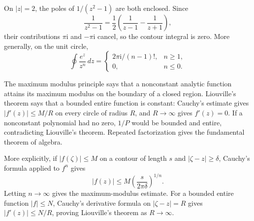 \begin{example}
On $|z|=2$, the poles of $1/(z^2-1)$ are both enclosed. Since
\begin{equation}
\frac{1}{z^2-1}=\frac12\left(\frac{1}{z-1}-\frac{1}{z+1}\right),
\end{equation}
their contributions $\pi\mathrm{i}$ and $-\pi\mathrm{i}$ cancel, so the contour integral is zero. More generally, on the unit circle,
\begin{equation}
\oint\frac{e^z}{z^n}\,dz=\begin{cases}
2\pi\mathrm{i}/(n-1)!,&n\geq1,\\0,&n\leq0.
\end{cases}
\end{equation}
\end{example}

The maximum modulus principle says that a nonconstant analytic function attains its maximum modulus on the boundary of a closed region. Liouville's theorem says that a bounded entire function is constant: Cauchy's estimate gives $|f'(z)|\leq M/R$ on every circle of radius $R$, and $R\to\infty$ gives $f'(z)=0$. If a nonconstant polynomial had no zero, $1/P$ would be bounded and entire, contradicting Liouville's theorem. Repeated factorization gives the fundamental theorem of algebra.

More explicitly, if $|f(\zeta)|\leq M$ on a contour of length $s$ and $|\zeta-z|\geq\delta$, Cauchy's formula applied to $f^n$ gives
\begin{equation}
|f(z)|\leq M\left(\frac{s}{2\pi\delta}\right)^{1/n}.
\end{equation}
Letting $n\to\infty$ gives the maximum-modulus estimate. For a bounded entire function $|f|\leq N$, Cauchy's derivative formula on $|\zeta-z|=R$ gives $|f'(z)|\leq N/R$, proving Liouville's theorem as $R\to\infty$.
